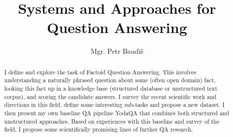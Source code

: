 \documentclass[11pt,a4paper,notitlepage]{report}
\title{Systems and Approaches for Question Answering}
\author{Mgr. Petr Baudiš}
\begin{document}
\maketitle

\begin{abstract}%
	I define and explore the task of Factoid Question Answering.
	This involves understanding a naturally phrased question
	about some (often open domain) fact, looking this fact up
	in a knowledge base (structured database or unstructured
	text corpus), and scoring the candidate answers.
	I survey the recent scientific work and directions in this
	field, define some interesting sub-tasks and propose a new dataset.
	I then present my own baseline QA pipeline YodaQA that
	combines both structured and unstructured approaches.
	Based on experiences with this baseline and survey of the
	field, I propose some scientifically promising lines of further
	QA research.
\end{abstract}

\tableofcontents







\appendix

%



\end{document}
